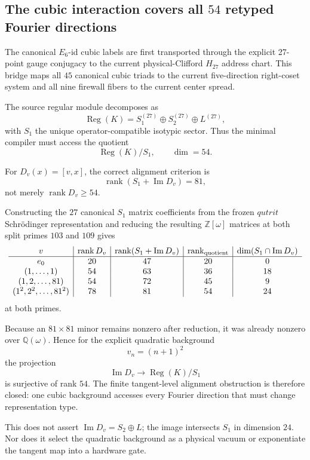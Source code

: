 \subsection*{The cubic interaction covers all $54$ retyped Fourier directions}

The canonical $E_6$-id cubic labels are first transported through the explicit 27-point gauge conjugacy to the current physical-Clifford $H_{27}$ address chart.  This bridge maps all $45$ canonical cubic triads to the current five-direction right-coset system and all nine firewall fibers to the current center spread.

The source regular module decomposes as
\[
 \operatorname{Reg}(K)=S_1^{(27)}\oplus S_2^{(27)}\oplus L^{(27)},
\]
with $S_1$ the unique operator-compatible isotypic sector.  Thus the minimal
compiler must access the quotient
\[
 \operatorname{Reg}(K)/S_1,
 \qquad \dim=54.
\]

For $D_v(x)=[v,x]$, the correct alignment criterion is
\[
 \operatorname{rank}\!\left(S_1+\operatorname{Im}D_v\right)=81,
\]
not merely $\operatorname{rank}D_v\ge54$.

Constructing the $27$ canonical $S_1$ matrix coefficients from the frozen
$qutrit$ Schrödinger representation and reducing the resulting
$\mathbb Z[\omega]$ matrices at both split primes $103$ and $109$ gives
\[
\begin{array}{c|c|c|c|c}
v & \operatorname{rank}D_v &
\operatorname{rank}(S_1+\operatorname{Im}D_v) &
\operatorname{rank}_{\rm quotient} &
\dim(S_1\cap\operatorname{Im}D_v)\\ \hline
e_0 & 20 & 47 & 20 & 0\\
(1,\ldots,1) & 54 & 63 & 36 & 18\\
(1,2,\ldots,81) & 54 & 72 & 45 & 9\\
(1^2,2^2,\ldots,81^2) & 78 & 81 & 54 & 24
\end{array}
\]
at both primes.

Because an $81\times81$ minor remains nonzero after reduction, it was already
nonzero over $\mathbb Q(\omega)$.  Hence for the explicit quadratic background
\[
 v_n=(n+1)^2
\]
the projection
\[
 \operatorname{Im}D_v\longrightarrow\operatorname{Reg}(K)/S_1
\]
is surjective of rank $54$.  The finite tangent-level alignment obstruction is
therefore closed: one cubic background accesses every Fourier direction that
must change representation type.

This does not assert $\operatorname{Im}D_v=S_2\oplus L$; the image intersects
$S_1$ in dimension $24$.  Nor does it select the quadratic background as a
physical vacuum or exponentiate the tangent map into a hardware gate.
